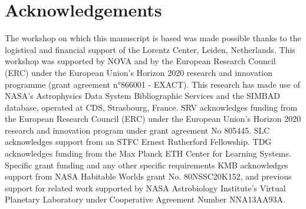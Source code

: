\documentclass[
    usenatbib,
]{mnras}
\begin{document}
\section*{Acknowledgements}

The workshop on which this manuscript is based was made possible thanks to the logistical and financial support of the Lorentz Center, Leiden, Netherlands.
%
This workshop was supported by NOVA  and by the European Research Council (ERC) under the European Union's Horizon 2020 research and innovation programme (grant agreement n°866001 - EXACT).
%
This research has made use of NASA's Astrophysics Data System Bibliographic Services and the SIMBAD database, operated at CDS, Strasbourg, France. 
%
SRV acknowledges funding from the European Research Council (ERC) under the European Union’s Horizon 2020 research and innovation program under grant agreement No 805445.
%
SLC acknowledges support from an STFC Ernest Rutherford Fellowship. 
%
TDG acknowledges funding from the Max Planck ETH Center for Learning Systems.
%
Specific grant funding and any other specific requirements
%
KMB acknowledges support from NASA Habitable
%
Worlds grant No. 80NSSC20K152, and previous support for related work supported by NASA Astrobiology Institute's Virtual Planetary Laboratory under Cooperative Agreement Number NNA13AA93A.



\end{document}
